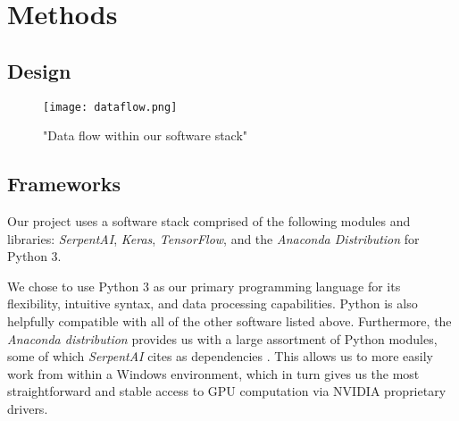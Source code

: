 \chapter{Methods}


\section{Design}

\begin{figure}
	\caption{"Data flow within our software stack"}
	\centering
		\texttt{[image: dataflow.png]} \\
\end{figure}



\section{Frameworks}

Our project uses a software stack comprised of the following modules and libraries: {\it SerpentAI}, {\it Keras}, {\it TensorFlow}, and the {\it Anaconda Distribution} for Python 3.

We chose to use Python 3 as our primary programming language for its flexibility, intuitive syntax, and data processing capabilities. Python is also helpfully compatible with all of the other software listed above. Furthermore, the {\it Anaconda distribution} provides us with a large assortment of Python modules, some of which {\it SerpentAI} cites as dependencies \cite{SerpentAI}. This allows us to more easily work from within a Windows environment, which in turn gives us the most straightforward and stable access to GPU computation via NVIDIA proprietary drivers.

